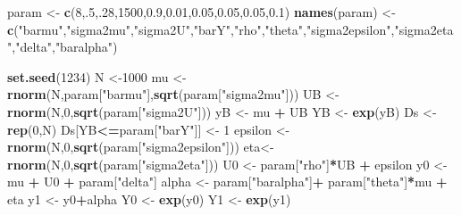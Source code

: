 \documentclass[]{book}
\newenvironment{Shaded}{\begin{snugshade}}{\end{snugshade}}
\newcommand{\DecValTok}[1]{\textcolor[rgb]{0.00,0.00,0.81}{#1}}
\newcommand{\FloatTok}[1]{\textcolor[rgb]{0.00,0.00,0.81}{#1}}
\newcommand{\KeywordTok}[1]{\textcolor[rgb]{0.13,0.29,0.53}{\textbf{#1}}}
\newcommand{\NormalTok}[1]{#1}
\newcommand{\OperatorTok}[1]{\textcolor[rgb]{0.81,0.36,0.00}{\textbf{#1}}}
\newcommand{\StringTok}[1]{\textcolor[rgb]{0.31,0.60,0.02}{#1}}
\theoremstyle{definition}
\theoremstyle{definition}
\theoremstyle{definition}
\theoremstyle{remark}
\begin{document}
\begin{Shaded}
\begin{Highlighting}[]
\NormalTok{param <-}\StringTok{ }\KeywordTok{c}\NormalTok{(}\DecValTok{8}\NormalTok{,.}\DecValTok{5}\NormalTok{,.}\DecValTok{28}\NormalTok{,}\DecValTok{1500}\NormalTok{,}\FloatTok{0.9}\NormalTok{,}\FloatTok{0.01}\NormalTok{,}\FloatTok{0.05}\NormalTok{,}\FloatTok{0.05}\NormalTok{,}\FloatTok{0.05}\NormalTok{,}\FloatTok{0.1}\NormalTok{)}
\KeywordTok{names}\NormalTok{(param) <-}\StringTok{ }\KeywordTok{c}\NormalTok{(}\StringTok{"barmu"}\NormalTok{,}\StringTok{"sigma2mu"}\NormalTok{,}\StringTok{"sigma2U"}\NormalTok{,}\StringTok{"barY"}\NormalTok{,}\StringTok{"rho"}\NormalTok{,}\StringTok{"theta"}\NormalTok{,}\StringTok{"sigma2epsilon"}\NormalTok{,}\StringTok{"sigma2eta"}\NormalTok{,}\StringTok{"delta"}\NormalTok{,}\StringTok{"baralpha"}\NormalTok{)}
\end{Highlighting}
\end{Shaded}

\begin{Shaded}
\begin{Highlighting}[]
\KeywordTok{set.seed}\NormalTok{(}\DecValTok{1234}\NormalTok{)}
\NormalTok{N <-}\DecValTok{1000}
\NormalTok{mu <-}\StringTok{ }\KeywordTok{rnorm}\NormalTok{(N,param[}\StringTok{"barmu"}\NormalTok{],}\KeywordTok{sqrt}\NormalTok{(param[}\StringTok{"sigma2mu"}\NormalTok{]))}
\NormalTok{UB <-}\StringTok{ }\KeywordTok{rnorm}\NormalTok{(N,}\DecValTok{0}\NormalTok{,}\KeywordTok{sqrt}\NormalTok{(param[}\StringTok{"sigma2U"}\NormalTok{]))}
\NormalTok{yB <-}\StringTok{ }\NormalTok{mu }\OperatorTok{+}\StringTok{ }\NormalTok{UB }
\NormalTok{YB <-}\StringTok{ }\KeywordTok{exp}\NormalTok{(yB)}
\NormalTok{Ds <-}\StringTok{ }\KeywordTok{rep}\NormalTok{(}\DecValTok{0}\NormalTok{,N)}
\NormalTok{Ds[YB}\OperatorTok{<=}\NormalTok{param[}\StringTok{"barY"}\NormalTok{]] <-}\StringTok{ }\DecValTok{1} 
\NormalTok{epsilon <-}\StringTok{ }\KeywordTok{rnorm}\NormalTok{(N,}\DecValTok{0}\NormalTok{,}\KeywordTok{sqrt}\NormalTok{(param[}\StringTok{"sigma2epsilon"}\NormalTok{]))}
\NormalTok{eta<-}\StringTok{ }\KeywordTok{rnorm}\NormalTok{(N,}\DecValTok{0}\NormalTok{,}\KeywordTok{sqrt}\NormalTok{(param[}\StringTok{"sigma2eta"}\NormalTok{]))}
\NormalTok{U0 <-}\StringTok{ }\NormalTok{param[}\StringTok{"rho"}\NormalTok{]}\OperatorTok{*}\NormalTok{UB }\OperatorTok{+}\StringTok{ }\NormalTok{epsilon}
\NormalTok{y0 <-}\StringTok{ }\NormalTok{mu }\OperatorTok{+}\StringTok{  }\NormalTok{U0 }\OperatorTok{+}\StringTok{ }\NormalTok{param[}\StringTok{"delta"}\NormalTok{]}
\NormalTok{alpha <-}\StringTok{ }\NormalTok{param[}\StringTok{"baralpha"}\NormalTok{]}\OperatorTok{+}\StringTok{  }\NormalTok{param[}\StringTok{"theta"}\NormalTok{]}\OperatorTok{*}\NormalTok{mu }\OperatorTok{+}\StringTok{ }\NormalTok{eta}
\NormalTok{y1 <-}\StringTok{ }\NormalTok{y0}\OperatorTok{+}\NormalTok{alpha}
\NormalTok{Y0 <-}\StringTok{ }\KeywordTok{exp}\NormalTok{(y0)}
\NormalTok{Y1 <-}\StringTok{ }\KeywordTok{exp}\NormalTok{(y1)}
\end{Highlighting}
\end{Shaded}
\end{document}
